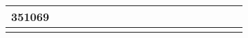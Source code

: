 \documentclass[letterpaper,10pt,english]{sphinxmanual}
\begin{document}
\begin{savenotes}
\begin{tabulary}{\linewidth}[t]{|T|T|T|T|T|T|T|T|T|T|T|T|T|T|T|T|T|T|}
351069
&
&
&
&
&
&
&
\\
\hline
{}
&
&
&
&
&
&
&
&
&
&
&
&
&
&
&
&
&
\\
\hline
\end{tabulary}
\par
\sphinxattableend\end{savenotes}
\end{document}
